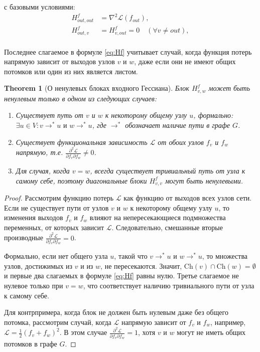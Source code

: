 \documentclass[11pt]{article}
\newtheorem{theorem}{Theorem}
\newcommand{\Ch}{\mathrm{Ch}} %
\begin{document}
с базовыми условиями:
\begin{align}
  H^f_{out,out} &= \nabla^2\mathcal L(f_{out}), \nonumber\\
  H^f_{out,v} &= H^f_{v,out} = 0\quad (\forall v\neq out), \nonumber\\
\end{align}

Последнее слагаемое в формуле \eqref{eq:Hf} учитывает случай, когда функция потерь напрямую зависит от
выходов узлов $v$ и $w$, даже если они не имеют общих потомков или один из них является листом.

\begin{theorem}[О ненулевых блоках входного Гессиана]
  Блок $H^f_{v,w}$ может быть ненулевым только в одном из следующих случаев:
  \begin{enumerate}
    \item Существует путь от $v$ и $w$ к некоторому общему узлу $u$, формально: $\exists u \in V: v
      \rightarrow^* u \text{ и } w \rightarrow^* u$, где $\rightarrow^*$ обозначает наличие пути в графе $G$.
    \item Существует функциональная зависимость $\mathcal{L}$ от обоих узлов $f_v$ и $f_w$ напрямую, т.е.
      $\frac{\partial^2 \mathcal{L}}{\partial f_v \partial f_w} \neq 0$.
    \item Для случая, когда $v = w$, всегда существует тривиальный путь от узла к самому себе, поэтому
      диагональные блоки $H^f_{v,v}$ могут быть ненулевыми.
  \end{enumerate}
\end{theorem}

\begin{proof}
  Рассмотрим функцию потерь $\mathcal{L}$ как функцию от выходов всех узлов сети. Если не существует пути от
  узлов $v$ и $w$ к некоторому общему узлу $u$, то изменения выходов $f_v$ и $f_w$ влияют на непересекающиеся
  подмножества переменных, от которых зависит $\mathcal{L}$. Следовательно, смешанные вторые производные
  $\frac{\partial^2 \mathcal{L}}{\partial f_v \partial f_w} = 0$.

  Формально, если нет общего узла $u$, такой что $v \rightarrow^* u$ и $w \rightarrow^* u$, то множества
  узлов, достижимых из $v$ и из $w$, не пересекаются. Значит, $\Ch(v) \cap \Ch(w) = \emptyset$ и первые два
  слагаемых в формуле \eqref{eq:Hf} равны нулю. Третье слагаемое не нулевое только при $v=w$, что
  соответствует наличию тривиального пути от узла к самому себе.

  Для контрпримера, когда блок не должен быть нулевым даже без общего потомка, рассмотрим случай, когда
  $\mathcal{L}$ напрямую зависит от $f_v$ и $f_w$, например, $\mathcal{L} = \frac{1}{2}(f_v + f_w)^2$. В этом
  случае $\frac{\partial^2 \mathcal{L}}{\partial f_v \partial f_w} = 1$, хотя $v$ и $w$ могут не иметь общих
  потомков в графе $G$.
\end{proof}
\end{document}

